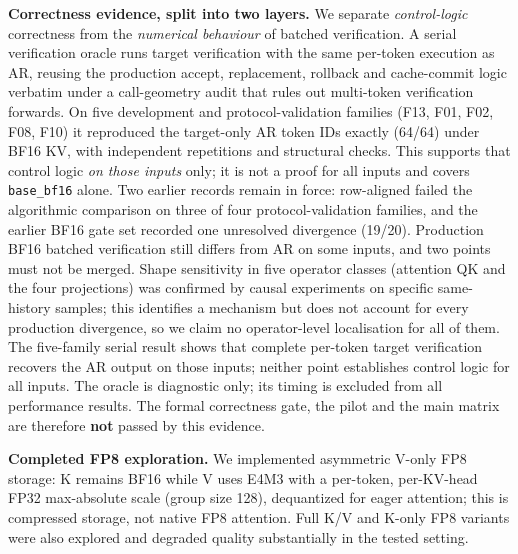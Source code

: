 \documentclass[11pt,a4paper]{article}
\begin{document}
\textbf{Correctness evidence, split into two layers.} We separate \emph{control-logic} correctness from the \emph{numerical behaviour} of batched verification. A serial verification oracle runs target verification with the same per-token execution as AR, reusing the production accept, replacement, rollback and cache-commit logic verbatim under a call-geometry audit that rules out multi-token verification forwards. On five development and protocol-validation families (F13, F01, F02, F08, F10) it reproduced the target-only AR token IDs exactly (64/64) under BF16 KV, with independent repetitions and structural checks. This supports that control logic \emph{on those inputs} only; it is not a proof for all inputs and covers \texttt{base\_bf16} alone. Two earlier records remain in force: row-aligned failed the algorithmic comparison on three of four protocol-validation families, and the earlier BF16 gate set recorded one unresolved divergence (19/20). Production BF16 batched verification still differs from AR on some inputs, and two points must not be merged. Shape sensitivity in five operator classes (attention QK and the four projections) was confirmed by causal experiments on specific same-history samples; this identifies a mechanism but does not account for every production divergence, so we claim no operator-level localisation for all of them. The five-family serial result shows that complete per-token target verification recovers the AR output on those inputs; neither point establishes control logic for all inputs. The oracle is diagnostic only; its timing is excluded from all performance results. The formal correctness gate, the pilot and the main matrix are therefore \textbf{not} passed by this evidence.

\textbf{Completed FP8 exploration.} We implemented asymmetric V-only FP8 storage: K remains BF16 while V uses E4M3 with a per-token, per-KV-head FP32 max-absolute scale (group size 128), dequantized for eager attention; this is compressed storage, not native FP8 attention. Full K/V and K-only FP8 variants were also explored and degraded quality substantially in the tested setting.
\end{document}
